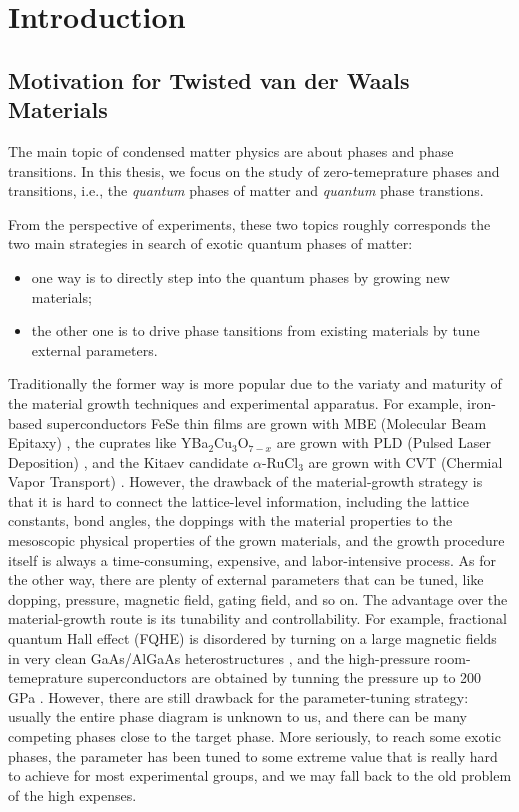 \chapter{Introduction}

\section{Motivation for Twisted van der Waals Materials}
The main topic of condensed matter physics are about phases and phase transitions. In this thesis, we focus on the study of zero-temeprature phases and transitions, i.e., the \emph{quantum} phases of matter and \emph{quantum} phase transtions.

From the perspective of experiments, these two topics roughly corresponds the two main strategies in search of exotic quantum phases of matter:
\begin{itemize}
    \item one way is to directly step into the quantum phases by growing new materials;
    \item the other one is to drive phase tansitions from existing materials by tune external parameters.
\end{itemize}
Traditionally the former way is more popular due to the variaty and maturity of the material growth techniques and experimental apparatus. For example, iron-based superconductors FeSe thin films are grown with MBE (Molecular Beam Epitaxy) \cite{lee2014interfacial}, the cuprates like YBa$_2$Cu$_3$O$_{7-x}$ are grown with PLD (Pulsed Laser Deposition) \cite{roas1988epitaxial}, and the Kitaev candidate $\alpha$-RuCl$_3$ are grown with CVT (Chermial Vapor Transport) \cite{gronke2018chemical}. However, the drawback of the material-growth strategy is that it is hard to connect the lattice-level information, including the lattice constants, bond angles, the doppings with the material properties to the mesoscopic physical properties of the grown materials, and the growth procedure itself is always a time-consuming, expensive, and labor-intensive process. As for the other way, there are plenty of external parameters that can be tuned, like dopping, pressure, magnetic field, gating field, and so on. The advantage over the material-growth route is its tunability and controllability. For example, fractional quantum Hall effect (FQHE) is disordered by turning on a large magnetic fields in very clean GaAs/AlGaAs heterostructures \cite{tsui1982two,willett1987observation,stormer1999fractional}, and the high-pressure room-temeprature superconductors are obtained by tunning the pressure up to 200 GPa \cite{gor2018colloquium}. However, there are still drawback for the parameter-tuning strategy: usually the entire phase diagram is unknown to us, and there can be many competing phases close to the target phase. More seriously, to reach some exotic phases, the parameter has been tuned to some extreme value that is really hard to achieve for most experimental groups, and we may fall back to the old problem of the high expenses.



